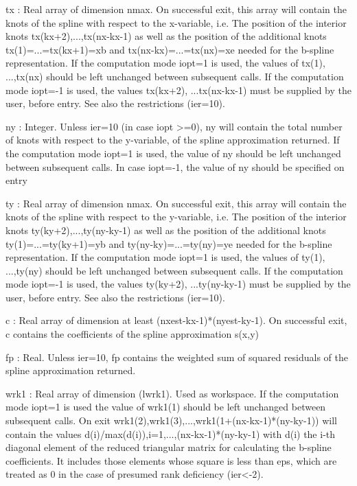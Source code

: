 \documentclass[11pt,twoside,nolof]{starlink}
\begin{document}
\begin{terminalv}
   tx    : Real array of dimension nmax. On successful exit, this array will
           contain the knots of the spline with respect to the x-variable,
           i.e. The position of the interior knots tx(kx+2),...,tx(nx-kx-1)
           as well as the position of the additional knots
           tx(1)=...=tx(kx+1)=xb and tx(nx-kx)=...=tx(nx)=xe needed for
           the b-spline representation. If the computation mode iopt=1 is
           used, the values of tx(1), ...,tx(nx) should be left unchanged
           between subsequent calls. If the computation mode iopt=-1 is
           used, the values tx(kx+2), ...tx(nx-kx-1) must be supplied by
           the user, before entry. See also the restrictions (ier=10).

   ny    : Integer. Unless ier=10 (in case iopt >=0), ny will contain the
           total number of knots with respect to the y-variable, of the
           spline approximation returned. If the computation mode iopt=1
           is used, the value of ny should be left unchanged between
           subsequent calls. In case iopt=-1, the value of ny should be
           specified on entry

   ty    : Real array of dimension nmax. On successful exit, this array
           will contain the knots of the spline with respect to the
           y-variable, i.e. The position of the interior knots
           ty(ky+2),...,ty(ny-ky-1) as well as the position of the
           additional knots ty(1)=...=ty(ky+1)=yb and
           ty(ny-ky)=...=ty(ny)=ye needed for the b-spline representation.
           If the computation mode iopt=1 is used, the values of ty(1),
           ...,ty(ny) should be left unchanged between subsequent calls.
           If the computation mode iopt=-1 is used, the values ty(ky+2),
           ...ty(ny-ky-1) must be supplied by the user, before entry. See
           also the restrictions (ier=10).

   c     : Real array of dimension at least (nxest-kx-1)*(nyest-ky-1).
           On successful exit, c contains the coefficients of the spline
           approximation s(x,y)

   fp    : Real. Unless ier=10, fp contains the weighted sum of
           squared residuals of the spline approximation returned.

   wrk1  : Real array of dimension (lwrk1). Used as workspace. If the
           computation mode iopt=1 is used the value of wrk1(1) should be
 	   left unchanged between subsequent calls. On exit
 	   wrk1(2),wrk1(3),...,wrk1(1+(nx-kx-1)*(ny-ky-1)) will contain
 	   the values d(i)/max(d(i)),i=1,...,(nx-kx-1)*(ny-ky-1) with d(i)
 	   the i-th diagonal element of the reduced triangular matrix for
 	   calculating the b-spline coefficients. It includes those
 	   elements whose square is less than eps, which are treated as 0
 	   in the case of presumed rank deficiency (ier<-2).


\end{terminalv}
\end{document}
